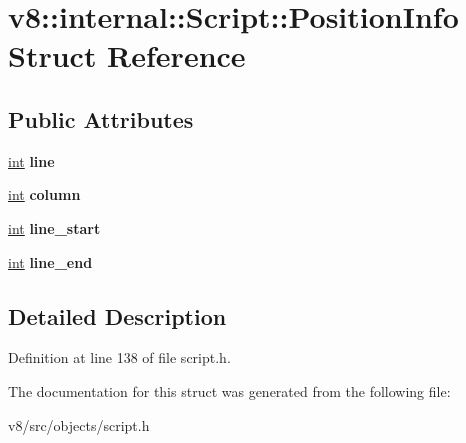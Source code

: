 \hypertarget{structv8_1_1internal_1_1Script_1_1PositionInfo}{}\section{v8\+:\+:internal\+:\+:Script\+:\+:Position\+Info Struct Reference}
\label{structv8_1_1internal_1_1Script_1_1PositionInfo}
\subsection*{Public Attributes}
\begin{DoxyCompactItemize}
\item 
\mbox{\label{structv8_1_1internal_1_1Script_1_1PositionInfo_a4558bd6df65456d0ee08136292d5d92f}} 
\mbox{\hyperlink{classint}{int}} {\bfseries line}
\item 
\mbox{\label{structv8_1_1internal_1_1Script_1_1PositionInfo_a36fa81f01863e6aa0a3439eadb1154bf}} 
\mbox{\hyperlink{classint}{int}} {\bfseries column}
\item 
\mbox{\label{structv8_1_1internal_1_1Script_1_1PositionInfo_a078b0b1f998f9874783c2a792814993a}} 
\mbox{\hyperlink{classint}{int}} {\bfseries line\+\_\+start}
\item 
\mbox{\label{structv8_1_1internal_1_1Script_1_1PositionInfo_a89ca876bcd2ad9bfe2d0db4b6a663f2c}} 
\mbox{\hyperlink{classint}{int}} {\bfseries line\+\_\+end}
\end{DoxyCompactItemize}


\subsection{Detailed Description}


Definition at line 138 of file script.\+h.



The documentation for this struct was generated from the following file\+:\begin{DoxyCompactItemize}
\item 
v8/src/objects/script.\+h\end{DoxyCompactItemize}
